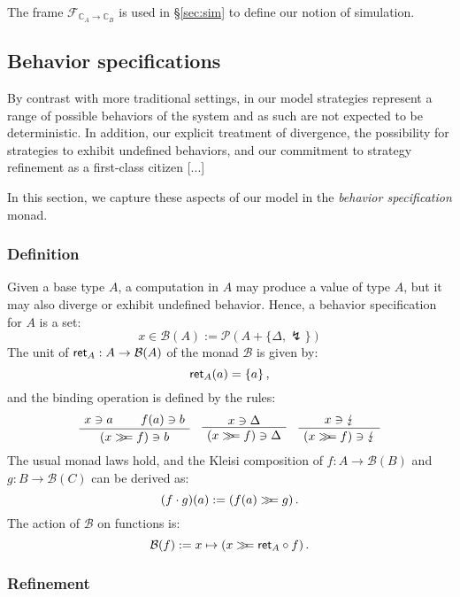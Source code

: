 The frame $\mathcal{F}_{\mathbb{C}_A \rightarrow \mathbb{C}_B}$
is used in \S\ref{sec:sim}
to define our notion of simulation.



\subsection{Behavior specifications} %

By contrast with more traditional settings,
in our model strategies represent a range of possible behaviors
of the system and as such are not expected to be deterministic.
In addition,
our explicit treatment of divergence,
the possibility for strategies to exhibit undefined behaviors,
and our commitment to strategy refinement as a first-class citizen
[...]

In this section,
we capture these aspects of our model
in the \emph{behavior specification} monad.

\subsubsection{Definition}

Given a base type $A$,
a computation in $A$
may produce a value of type $A$,
but it may also diverge or exhibit undefined behavior.
Hence,
a behavior specification for $A$ is a set:
\[
    x \in \mathcal{B}(A) := \mathcal{P}(A + \{ \Delta, \lightning \})
\]
The unit of $ \mathsf{ret} _A : A \rightarrow \mathcal{B}(A)$
of the monad $\mathcal{B}$ is given by:
\[
     \mathsf{ret} _A(a) = \{ a \} \,,
\]
and the binding operation is defined by the rules:
\[
    \AxiomC{$x \ni a$}
    \AxiomC{$f(a) \ni b$}
    \BinaryInfC{$(x \bind f) \ni b$}
    \DisplayProof
    \quad
    \AxiomC{$x \ni \Delta$}
    \UnaryInfC{$(x \bind f) \ni \Delta$}
    \DisplayProof
    \quad
    \AxiomC{$x \ni \lightning$}
    \UnaryInfC{$(x \bind f) \ni \lightning$}
    \DisplayProof
\]
The usual monad laws hold, and
the Kleisi composition of $f : A \rightarrow \mathcal{B}(B)$ and
$g : B \rightarrow \mathcal{B}(C)$ can be derived as:
\[
    (f \cdot g)(a) := (f(a) \gg\!\!= g) \,.
\]
The action of $\mathcal{B}$ on functions is:
\[
    \mathcal{B}(f) := x \mapsto (x \gg\!\!=  \mathsf{ret} _A \circ f) \,.
\]


\subsubsection{Refinement}

